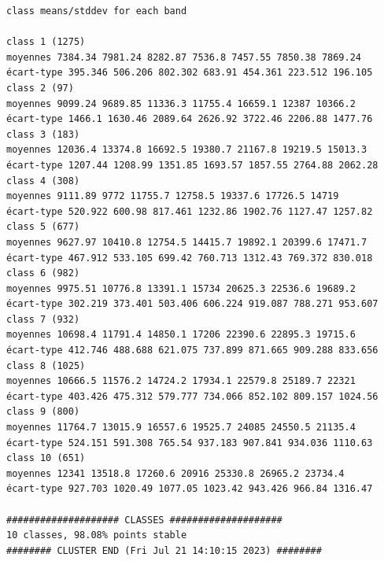\documentclass[land,article,submit,pdftex,moreauthors]{Definitions/mdpi}
\begin{document}
\begin{scriptsize}
\begin{verbatim}
class means/stddev for each band

class 1 (1275)
moyennes 7384.34 7981.24 8282.87 7536.8 7457.55 7850.38 7869.24
écart-type 395.346 506.206 802.302 683.91 454.361 223.512 196.105
class 2 (97)
moyennes 9099.24 9689.85 11336.3 11755.4 16659.1 12387 10366.2
écart-type 1466.1 1630.46 2089.64 2626.92 3722.46 2206.88 1477.76
class 3 (183)
moyennes 12036.4 13374.8 16692.5 19380.7 21167.8 19219.5 15013.3
écart-type 1207.44 1208.99 1351.85 1693.57 1857.55 2764.88 2062.28
class 4 (308)
moyennes 9111.89 9772 11755.7 12758.5 19337.6 17726.5 14719
écart-type 520.922 600.98 817.461 1232.86 1902.76 1127.47 1257.82
class 5 (677)
moyennes 9627.97 10410.8 12754.5 14415.7 19892.1 20399.6 17471.7
écart-type 467.912 533.105 699.42 760.713 1312.43 769.372 830.018
class 6 (982)
moyennes 9975.51 10776.8 13391.1 15734 20625.3 22536.6 19689.2
écart-type 302.219 373.401 503.406 606.224 919.087 788.271 953.607
class 7 (932)
moyennes 10698.4 11791.4 14850.1 17206 22390.6 22895.3 19715.6
écart-type 412.746 488.688 621.075 737.899 871.665 909.288 833.656
class 8 (1025)
moyennes 10666.5 11576.2 14724.2 17934.1 22579.8 25189.7 22321
écart-type 403.426 475.312 579.777 734.066 852.102 809.157 1024.56
class 9 (800)
moyennes 11764.7 13015.9 16557.6 19525.7 24085 24550.5 21135.4
écart-type 524.151 591.308 765.54 937.183 907.841 934.036 1110.63
class 10 (651)
moyennes 12341 13518.8 17260.6 20916 25330.8 26965.2 23734.4
écart-type 927.703 1020.49 1077.05 1023.42 943.426 966.84 1316.47

#################### CLASSES ####################
10 classes, 98.08% points stable
######## CLUSTER END (Fri Jul 21 14:10:15 2023) ########
\end{verbatim}
\end{scriptsize}
\end{document}
